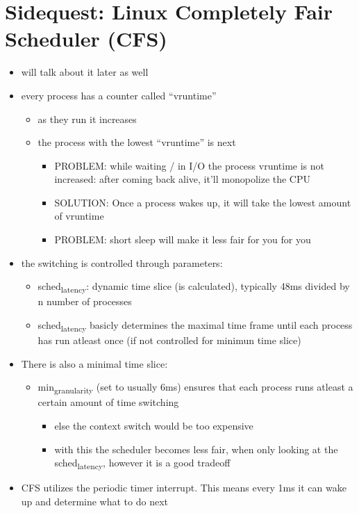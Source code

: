 \documentclass[11pt]{report}
\begin{document}
\section{Sidequest: Linux Completely Fair Scheduler (CFS)}
\label{sec:orgf8d6ba7}
\begin{itemize}
\item will talk about it later as well
\item every process has a counter called ``vruntime''
\begin{itemize}
\item as they run it increases
\item the process with the lowest ``vruntime'' is next
\begin{itemize}
\item PROBLEM: while waiting / in I/O the process vruntime is not increased: after coming back alive, it'll monopolize the CPU
\item SOLUTION: Once a process wakes up, it will take the lowest amount of vruntime
\item PROBLEM: short sleep will make it less fair for you for you
\end{itemize}
\end{itemize}
\item the switching is controlled through parameters:
\begin{itemize}
\item sched\textsubscript{latency}: dynamic time slice (is calculated), typically 48ms divided by n number of processes
\item sched\textsubscript{latency} basicly determines the maximal time frame until each process has run atleast once (if not controlled for minimun time slice)
\end{itemize}
\item There is also a minimal time slice:
\begin{itemize}
\item min\textsubscript{granularity} (set to usually 6ms) ensures that each process runs atleast a certain amount of time switching
\begin{itemize}
\item else the context switch would be too expensive
\item with this the scheduler becomes less fair, when only looking at the sched\textsubscript{latency}, however it is a good tradeoff
\end{itemize}
\end{itemize}
\item CFS utilizes the periodic timer interrupt. This means every 1ms it can wake up and determine what to do next
\end{itemize}
\end{document}
